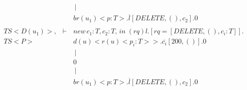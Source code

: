 \begin{eqnarray*}
 \               &        &    \,|\,      \\
 \               &        &  br(u_1)<p:T>.\overline{l}[DELETE,(),c_2].0 \\
 \               &        &          \\
 \ TS<D(u_1)>, &\vdash\,& new\,c_1:T,c_2:T,\,in\; (rq)l.[rq = [DELETE,(),c_i:T]].\\
 \ TS<P>   &        & d(u)<r(u)<p_i:T>>.\overline{c_i}[200,()].0         \\
 \         &        &    \,|\,      \\
 \               &        & 0 \\
 \               &        &    \,|\,      \\
 \               &        &  br(u_1)<p:T>.\overline{l}[DELETE,(),c_2].0 \\
 \               &        &          \\
\end{eqnarray*}

